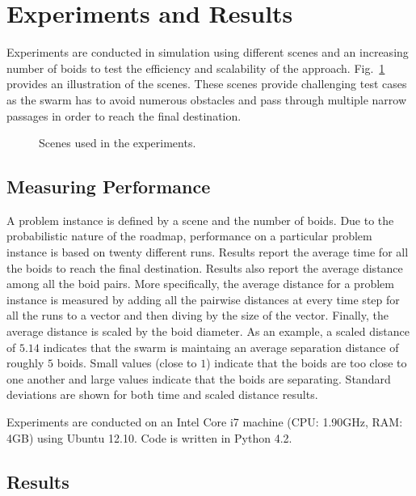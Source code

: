 \documentclass{llncs}
\newcommand{\Var}[1]{\ensuremath{{\small{\textsl{#1}}}}}
\begin{document}
\section{Experiments and Results}
\label{sec:ExpResults}

Experiments are conducted in simulation using different scenes and an
increasing number of boids to test the efficiency and scalability of
the approach. Fig.~\ref{fig:Scenes} provides an illustration of the
scenes. These scenes provide challenging test cases as the swarm has
to avoid numerous obstacles and pass through multiple narrow passages
in order to reach the final destination.

\begin{figure}
\caption{Scenes used in the experiments.}
\label{fig:Scenes}
\end{figure}

\subsection{Measuring Performance}
\label{sec:Measures}
A problem instance is defined by a scene and the number of boids. Due
to the probabilistic nature of the roadmap, performance on a
particular problem instance is based on twenty different runs.
Results report the average time for all the boids to reach the final
destination. Results also report the average distance among all the
boid pairs. More specifically, the average distance for a problem instance is measured by
adding all the pairwise distances at every time step for all the runs
to a vector and then diving by the size of the vector. Finally, the
average distance is scaled by the boid diameter. As an example, a
scaled distance of $5.14$ indicates that the swarm is maintaing an average
separation distance of roughly $5$ boids.  Small values (close to $1$)
indicate that the boids are too close to one another and large values
indicate that the boids are separating. Standard deviations are shown
for both time and scaled distance results.


Experiments are conducted on an Intel Core i7 machine (CPU: 1.90GHz,
RAM: 4GB) using Ubuntu 12.10. Code is written in Python 4.2. 

\subsection{Results}
\label{sec:Results}
\end{document}
